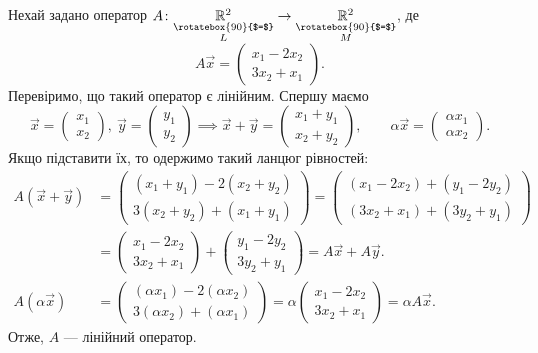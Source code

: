 \documentclass{math_library}
\begin{document}
	\begin{example}
	Нехай задано оператор $A \colon \underset{\substack{\rotatebox{90}{$=$} \\ L}}{\mathbb{R}^2} \to \underset{\substack{\rotatebox{90}{$=$} \\ M}}{\mathbb{R}^2}$, де
	\[
	 A\vec{x} = \begin{pmatrix} x_1 - 2x_2 \\ 3x_2 + x_1 \end{pmatrix}.
	 \]
	Перевіримо, що такий оператор є лінійним. Спершу маємо
	\[
	\vec{x} = \begin{pmatrix} x_1 \\ x_2 \end{pmatrix},\ \vec{y} = \begin{pmatrix} y_1 \\ y_2 \end{pmatrix} \implies \vec{x} + \vec{y} = \begin{pmatrix}
	x_1 + y_1 \\ x_2 + y_2
	\end{pmatrix},\qquad \alpha \vec{x} = \begin{pmatrix} \alpha x_1 \\ \alpha x_2 \end{pmatrix}.
	\]
	Якщо підставити їх, то одержимо такий ланцюг рівностей:
	\begin{align*}
	A(\vec{x} + \vec{y}) & = \begin{pmatrix} (x_1+y_1)-2(x_2+y_2) \\ 3(x_2+y_2)+(x_1+y_1) \end{pmatrix} = \begin{pmatrix} (x_1-2x_2) + (y_1-2y_2) \\ (3x_2+x_1) + (3y_2+y_1) \end{pmatrix} 
	\\& = \begin{pmatrix} x_1 - 2x_2 \\ 3x_2 + x_1 \end{pmatrix} + \begin{pmatrix} y_1 - 2y_2 \\ 3y_2 + y_1 \end{pmatrix} = A\vec{x} + A\vec{y}. \\
	A(\alpha \vec{x}) & = \begin{pmatrix} (\alpha x_1) - 2(\alpha x_2) \\ 3(\alpha x_2) + (\alpha x_1) \end{pmatrix} = \alpha \begin{pmatrix} x_1 - 2x_2 \\ 3x_2 + x_1 \end{pmatrix} = \alpha A\vec{x}.
	\end{align*}
	Отже, $A$ --- лінійний оператор.
	\end{example}
	
\end{document}
